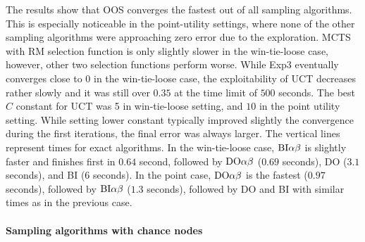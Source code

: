 The results show that OOS converges the fastest out of all sampling algorithms.
This is especially noticeable in the point-utility settings, where none of the other sampling algorithms were approaching zero error due to the exploration.
MCTS with RM selection function is only slightly slower in the win-tie-loose case, however, other two selection functions perform worse. 
While Exp3 eventually converges close to $0$ in the win-tie-loose case, the exploitability of UCT decreases rather slowly and it was still over $0.35$ at the time limit of $500$ seconds. 
The best $C$ constant for UCT was 5 in win-tie-loose setting, and $10$ in the point utility setting. 
While setting lower constant typically improved slightly the 
convergence during the first iterations, the final error was always larger.
The vertical lines represent times for exact algorithms.
In the win-tie-loose case, $\textrm{BI}\alpha\beta$ is slightly faster and finishes first in $0.64$ second, followed by $\textrm{DO}\alpha\beta$ ($0.69$ seconds), \textsc{DO} ($3.1$ seconds), and \textsc{BI} ($6$ seconds).
In the point case, $\textrm{DO}\alpha\beta$ is the fastest ($0.97$ seconds), followed by $\textrm{BI}\alpha\beta$ ($1.3$ seconds), followed by \textsc{DO} and \textsc{BI} with similar times as in the previous case.

\paragraph{Sampling algorithms with chance nodes}

